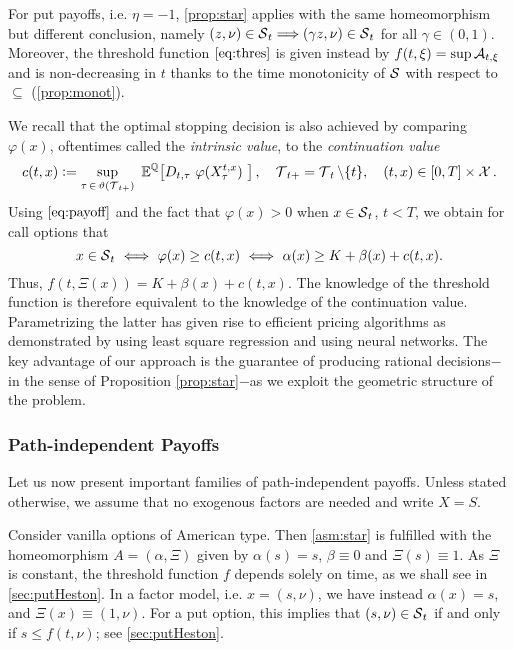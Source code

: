 \begin{remark}
For put payoffs, i.e. $\eta =-1$,  \cref{prop:star} applies with the same homeomorphism but different conclusion, namely  $(z,\nu)\in \operatorname{\mathcal{S}}_t \Longrightarrow (\gamma z,\nu) \in \operatorname{\mathcal{S}}_t$ for all $\gamma \in (0,1)$. Moreover, the threshold function $\eqref{eq:thres}$ is given instead by 
$f(t,\xi) = \sup \operatorname{\mathcal{A}}_{t,\xi}$ and is  non-decreasing in $t$  thanks to the time  monotonicity of $\operatorname{\mathcal{S}}$ with respect to  $\subseteq$ (\cref{prop:monot}). 
\end{remark}

\begin{remark}
We recall that the optimal stopping decision is also achieved by comparing 
$\varphi(x)$, oftentimes called the \textit{intrinsic value}, to the \textit{continuation value}
\begin{equation} \label{eq:contValue}
c(t,x) := \underset{\tau \, \in\,  \vartheta(\calT_{t+})}{\text{sup}} \
\E^{\Q}\! \left[ D_{t,\tau}\ \varphi(X^{t,x}_\tau)\ \right],\quad  \calT_{t+} = \calT_t \setminus\{t\}, \quad (t,x)\in [0,T]\times \calX.
\end{equation}
Using $\eqref{eq:payoff}$ and the fact that $\varphi(x)>0$ when $x\in \operatorname{\mathcal{S}}_t$, $t<T$, we obtain for call options that  
$$x \in \calS_t \ \Longleftrightarrow \ \varphi(x) \ge c(t,x) \ \Longleftrightarrow \ \alpha(x) \ge K + \beta(x) + c(t,x).$$
Thus, $f(t,\Xi(x)) = K+ \beta(x)  +  c(t,x)$. The knowledge of the threshold function is therefore equivalent to the knowledge of the continuation value.  Parametrizing  the latter
 has given rise to efficient pricing algorithms as demonstrated by \citet{LSMC} using least square regression and 
 \citet{Kohler} using neural networks. 
The key advantage of our  approach  is the guarantee of producing  rational decisions$-$in the sense of Proposition \ref{prop:star}$-$as we exploit the geometric structure of the problem. 
\end{remark}

\subsubsection*{Path-independent Payoffs}
Let us now present important families of path-independent payoffs. Unless stated otherwise,  we assume that no exogenous factors are needed  and write $X=S$. 

\begin{example}\label{ex:vanilla}

Consider vanilla  options of American type. 
Then \cref{asm:star} is fulfilled with the homeomorphism $A = (\alpha,\Xi)$ given by $\alpha(s) = s$, $\beta \equiv 0$ and $\Xi(s) \equiv 1$. 
As $\Xi$ is constant, the threshold function $f$ depends solely on time, as we shall see in  \cref{sec:putHeston}.   In a factor model, i.e. $x = (s,\nu)$, we have instead $\alpha(x)=s$, and $\Xi(x) \equiv (1,\nu)$. For a put option, this implies that $(s,\nu) \in \operatorname{\mathcal{S}}_t$ if and only if $s\le f(t,\nu)$; see \cref{sec:putHeston}.   

\end{example}

